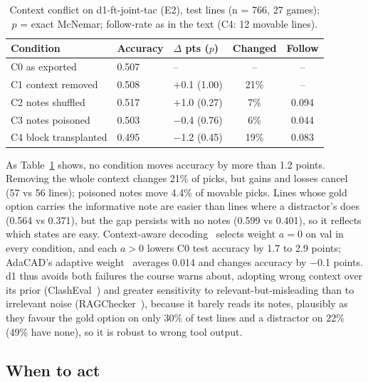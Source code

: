 \begin{table}[t]
\caption{Context conflict on d1-ft-joint-tac (E2), test lines (n = 766, 27 games); $p$ = exact McNemar; follow-rate as in the text (C4: 12 movable lines).}
\label{tab:conflict}
\centering\scriptsize
\setlength{\tabcolsep}{3pt}
\begin{tabular}{@{}lllcc@{}}
\toprule
Condition & Accuracy & $\Delta$ pts ($p$) & Changed & Follow\\
\midrule
C0 as exported & 0.507 & -- & -- & --\\
C1 context removed & 0.508 & +0.1 (1.00) & 21\% & --\\
C2 notes shuffled & 0.517 & +1.0 (0.27) & 7\% & 0.094\\
C3 notes poisoned & 0.503 & $-$0.4 (0.76) & 6\% & 0.044\\
C4 block transplanted & 0.495 & $-$1.2 (0.45) & 19\% & 0.083\\
\bottomrule
\end{tabular}
\end{table}

As Table~\ref{tab:conflict} shows, no condition moves accuracy by more than 1.2 points. Removing the whole context changes 21\% of picks, but gains and losses cancel (57 vs 56 lines); poisoned notes move 4.4\% of movable picks. Lines whose gold option carries the informative note are easier than lines where a distractor's does (0.564 vs 0.371), but the gap persists with no notes (0.599 vs 0.401), so it reflects which states are easy. Context-aware decoding~\cite{shi2024cad} selects weight $a=0$ on val in every condition, and each $a>0$ lowers C0 test accuracy by 1.7 to 2.9 points; AdaCAD's adaptive weight~\cite{wang2025adacad} averages 0.014 and changes accuracy by $-$0.1 points. %
d1 thus avoids both failures the course warns about, adopting wrong context over its prior (ClashEval~\cite{wu2024clasheval}) and greater sensitivity to relevant-but-misleading than to irrelevant noise (RAGChecker~\cite{ru2024ragchecker}), because it barely reads its notes, plausibly as they favour the gold option on only 30\% of test lines and a distractor on 22\% (49\% have none), so it is robust to wrong tool output. %

\subsection{When to act}
\label{sec:timing}

